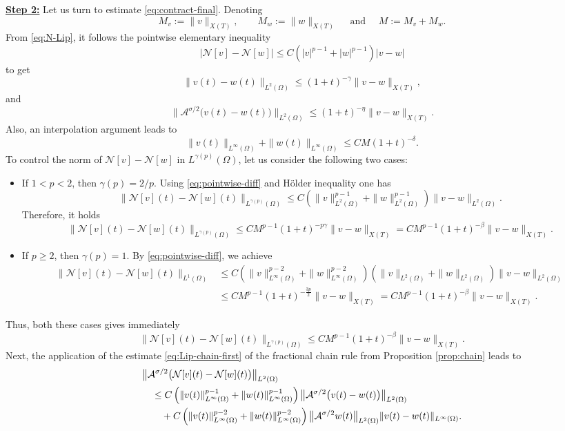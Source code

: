 \documentclass[a4paper,11pt]{article} %
\theoremstyle{remark}
\theoremstyle{definition}
\numberwithin{equation}{section}
\begin{document}
\noindent\textbf{\underline{Step 2:}} Let us turn to estimate \eqref{eq:contract-final}. Denoting
\[
M_v:=\|v\|_{X(T)},
\qquad
M_w:=\|w\|_{X(T)}
\quad \text{ and }\quad
M:=M_v+M_w.
\]
From \eqref{eq:N-Lip}, it follows the pointwise elementary inequality 
\begin{equation}\label{eq:pointwise-diff}
\big|\mathcal{N}[v]-\mathcal{N}[w]\big|
\le
C
\left(
|v|^{p-1}+|w|^{p-1}
\right)
|v-w|
\end{equation}
to get
\[
\|v(t)-w(t)\|_{L^2(\Omega)}
\le
(1+t)^{-\gamma}\|v-w\|_{X(T)},
\]
and
\[
\big\|\mathcal{A}^{\sigma/2}\big(v(t)-w(t)\big)\big\|_{L^2(\Omega)}
\le
(1+t)^{-\eta}\|v-w\|_{X(T)}.
\]
Also, an interpolation argument leads to
\[
\|v(t)\|_{L^\infty(\Omega)}
+
\|w(t)\|_{L^\infty(\Omega)}
\le
CM
(1+t)^{-\delta}.
\]
To control the norm of $\mathcal{N}[v]-\mathcal{N}[w]$ in \(L^{\gamma(p)}(\Omega)\), let us consider the following two cases:
\begin{itemize}
    \item If \(1<p<2\), then \(\gamma(p)=2/p\). Using \eqref{eq:pointwise-diff} and H\"{o}lder inequality one has
\[
\big\|\mathcal{N}[v](t)-\mathcal{N}[w](t)\big\|_{L^{\gamma(p)}(\Omega)}
\le
C
\left(
\|v\|_{L^2(\Omega)}^{p-1}
+
\|w\|_{L^2(\Omega)}^{p-1}
\right)
\|v-w\|_{L^2(\Omega)}.
\]
Therefore, it holds
\[
\big\|\mathcal{N}[v](t)-\mathcal{N}[w](t)\big\|_{L^{\gamma(p)}(\Omega)}
\le
CM^{p-1} (1+t)^{-p\gamma}\|v-w\|_{X(T)} = CM^{p-1}(1+t)^{-\beta}\|v-w\|_{X(T)}.
\]
    \item If \(p\ge2\), then \(\gamma(p)=1\). By \eqref{eq:pointwise-diff}, we achieve
\begin{align*}
\big\|\mathcal{N}[v](t)-\mathcal{N}[w](t)\big\|_{L^1(\Omega)}
&\le
C\left(\|v\|_{L^\infty(\Omega)}^{p-2}+\|w\|_{L^\infty(\Omega)}^{p-2}\right) \left(\|v\|_{L^2(\Omega)}+\|w\|_{L^2(\Omega)}\right)\|v-w\|_{L^2(\Omega)} \\
&\le
CM^{p-1}(1+t)^{-\frac{3p}{2}}\|v-w\|_{X(T)}= CM^{p-1}(1+t)^{-\beta}\|v-w\|_{X(T)}.
\end{align*}
\end{itemize}
Thus, both these cases gives immediately
\begin{equation}\label{eq:diff-F-q}
\big\|\mathcal{N}[v](t)-\mathcal{N}[w](t)\big\|_{L^{\gamma(p)}(\Omega)}
\le CM^{p-1}(1+t)^{-\beta}\|v-w\|_{X(T)}.
\end{equation}
Next, the application of the estimate \eqref{eq:Lip-chain-first} of the fractional chain rule from Proposition \ref{prop:chain} leads to 
\begin{align*}
&\big\|\mathcal{A}^{\sigma/2}\big(\mathcal{N}[v](t)-\mathcal{N}[w](t)\big)\big\|_{L^2(\Omega)} \notag \\
&\quad\le
C
\left(
\|v(t)\|_{L^\infty(\Omega)}^{p-1}
+
\|w(t)\|_{L^\infty(\Omega)}^{p-1}
\right)\big\|\mathcal{A}^{\sigma/2}\big(v(t)-w(t)\big)\big\|_{L^2(\Omega)}
\notag\\
&\qquad+
C
\left(
\|v(t)\|_{L^\infty(\Omega)}^{p-2}
+
\|w(t)\|_{L^\infty(\Omega)}^{p-2}
\right)\big\|\mathcal{A}^{\sigma/2}w(t)\big\|_{L^2(\Omega)}
\|v(t)-w(t)\|_{L^\infty(\Omega)}.
\end{align*}
\end{document}
